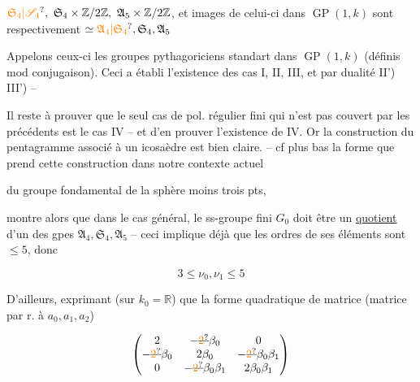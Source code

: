 $\unsure{\mathfrak S_4|\mathscr S_4},\ \mathfrak S_4\times\mathbb Z/2\mathbb Z,\ \mathfrak A_5\times\mathbb Z/2\mathbb Z$, et  images de celui-ci dans $\operatorname{GP}(1,k)$  sont respectivement $\simeq\unsure{\mathfrak A_4|\mathfrak S_4},\mathfrak S_4,\mathfrak A_5$

Appelons ceux-ci les groupes pythagoriciens standart dans $\operatorname{GP}(1,k)$ (définis mod conjugaison). Ceci a établi  l'existence des cas I, II, III, et par dualité II') III') -- 

Il reste à prouver que le seul cas de pol. régulier fini qui n'est pas couvert par les précédents est le cas IV -- et d'en prouver l'existence de IV. Or  la construction du pentagramme associé à un icosaèdre est bien claire. -- cf plus bas la forme que prend cette construction dans notre contexte actuel



 du groupe fondamental de la sphère moins trois pts, 

 montre alors que dans le cas général, le ss-groupe fini $G_0$  doit être un \uline{quotient} d'un des gpes $\mathfrak A_4,\mathfrak S_4,\mathfrak A_5$ -- ceci implique déjà que les ordres de ses éléments sont $\leq5$, donc

\[
 \boxed{3\leq\nu_0,\nu_1\leq5}
\]

D'ailleurs, exprimant (sur $k_0=\mathbb R$) que la forme quadratique de matrice (matrice par r. à $a_0,a_1,a_2$)

\[
 \begin{pmatrix}
 2 & -\deleted{\unsure{2}}\beta_0 & 0\\
 -\deleted{\unsure{2}}\beta_0 & 2\beta_0 & -\deleted{\unsure{2}}\beta_0\beta_1\\
 0 & -\deleted{\unsure{2}}\beta_0\beta_1 & 2\beta_0\beta_1
 \end{pmatrix}
\]

